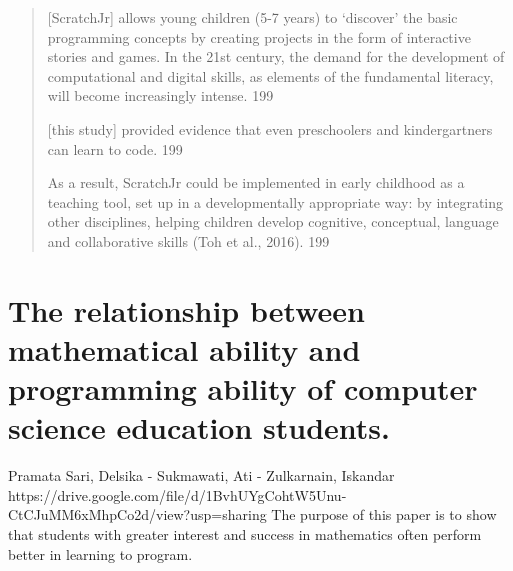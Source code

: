 \documentclass[12pt]{extarticle}
\begin{document}
\begin{quote}
    [ScratchJr] allows young children (5-7 years) to ‘discover’ the basic programming concepts by creating projects in the form of interactive stories and games.
    In the 21st century, the demand for the development of computational and digital skills, as elements of the fundamental literacy, will become increasingly intense.	199
    
    [this study] provided evidence that even preschoolers and kindergartners can learn to code.	199
    
    As a result, ScratchJr could be implemented in early childhood as a teaching tool, set up in a developmentally appropriate way: by integrating other disciplines, helping children develop cognitive, conceptual, language and collaborative skills (Toh et al., 2016). 	199
\end{quote}


\section{The relationship between mathematical ability and programming ability of computer science education students.}
Pramata Sari, Delsika - Sukmawati, Ati - Zulkarnain, Iskandar
https://drive.google.com/file/d/1BvhUYgCohtW5Unu-CtCJuMM6xMhpCo2d/view?usp=sharing 
The purpose of this paper is to show that students with greater interest and success in mathematics often perform better in learning to program.
\end{document}
